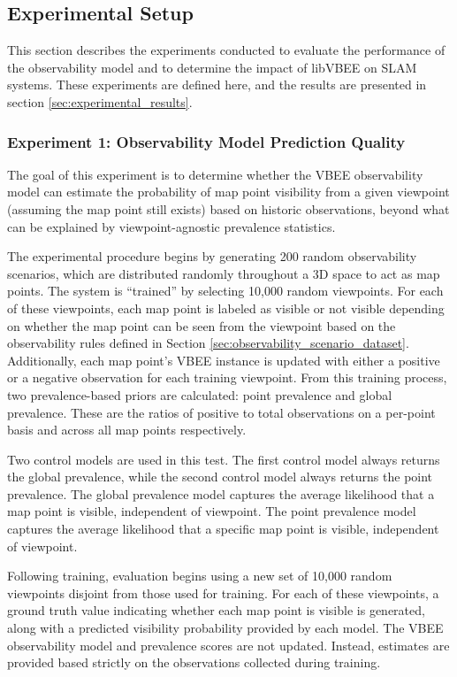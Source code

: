 \subsection{Experimental Setup}

This section describes the experiments conducted to evaluate the performance of the observability model and to determine the impact of libVBEE on SLAM systems. These experiments are defined here, and the results are presented in section \ref{sec:experimental_results}.

\subsubsection*{Experiment 1: Observability Model Prediction Quality}
The goal of this experiment is to determine whether the VBEE observability model can estimate the probability of map point visibility from a given viewpoint (assuming the map point still exists) based on historic observations, beyond what can be explained by viewpoint-agnostic prevalence statistics.

The experimental procedure begins by generating 200 random observability scenarios, which are distributed randomly throughout a 3D space to act as map points. The system is ``trained'' by selecting 10,000 random viewpoints. For each of these viewpoints, each map point is labeled as visible or not visible depending on whether the map point can be seen from the viewpoint based on the observability rules defined in Section \ref{sec:observability_scenario_dataset}. Additionally, each map point's VBEE instance is updated with either a positive or a negative observation for each training viewpoint. From this training process, two prevalence-based priors are calculated: point prevalence and global prevalence. These are the ratios of positive to total observations on a per-point basis and across all map points respectively.

Two control models are used in this test. The first control model always returns the global prevalence, while the second control model always returns the point prevalence. The global prevalence model captures the average likelihood that a map point is visible, independent of viewpoint. The point prevalence model captures the average likelihood that a specific map point is visible, independent of viewpoint.

Following training, evaluation begins using a new set of 10,000 random viewpoints disjoint from those used for training. For each of these viewpoints, a ground truth value indicating whether each map point is visible is generated, along with a predicted visibility probability provided by each model. The VBEE observability model and prevalence scores are not updated. Instead, estimates are provided based strictly on the observations collected during training.

